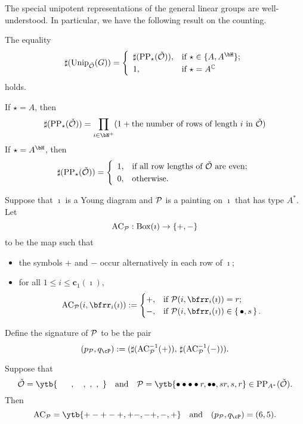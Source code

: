 \documentclass[counting_main.tex]{subfiles}
\begin{document}
 The special unipotent representations of the general linear groups are well-understood. In particular, we have the following result on the counting.
\begin{thm}
The equality
\[
\sharp(\Unip_{\check \CO}(G))= \left\{
     \begin{array}{ll}
        \sharp(\mathrm{PP}_\star(\check \CO)), &\hbox{if $\star\in\{A, A^\bH\}$}; \smallskip\\
           1, &\hbox{if $\star=A^\C$}  \end{array}
   \right.
\]
holds.

\end{thm}
\begin{remark}
If $\star=A$, then
\[
\sharp(\mathrm{PP}_\star(\check \CO))=\prod_{i\in \bN^+} (1+\textrm{the number of rows of length $i$ in $\check \CO$})
\]
If
 $\star=A^\bH$, then
\[
\sharp(\mathrm{PP}_\star(\check \CO))= \left\{
     \begin{array}{ll}
        1, &\hbox{if all row lengths of $\check \CO$ are even}; \smallskip\\
           0, &\hbox{otherwise}.  \end{array}
   \right.
\]

\end{remark}

Suppose that $\imath$ is a Young diagram and $\mathcal{P}$ is a painting on  $\imath$ that has type $A^*$. Let $$\mathrm{AC}_{\mathcal{P}}: \mathrm{Box}(\imath)\rightarrow \{+, -\}$$ to be the map such that
  \begin{itemize}
    \item the symbols $+$ and $-$ occur alternatively in each row of $\imath$;
    \item for all $1\leq i\leq \mathbf c_1(\imath) $,
    \[
       \mathrm{AC}_\CP (i,\bfrr_i(\imath)) := \begin{cases}
    +,  & \text{if  }\CP(i,\bfrr_i(\imath))=r;\\
    -,  & \text{if } \CP(i,\bfrr_i(\imath))\in \set{\bullet,s}.
  \end{cases}
    \]
  \end{itemize}
Define the signature of $\mathcal{P}$ to be the pair
\[
  (p_\CP, q_\cP):=(\sharp( \mathrm{AC}_\CP^{-1}(+)),\, \sharp( \mathrm{AC}_\CP^{-1}(-))).
\]

\begin{eg}
 Suppose that \[
\check \CO=\ytb{\ \ \ \ \ , \ \ \ , \ , \ , \   }\quad \textrm{and}\quad  \CP=\ytb{\bullet\bullet\bullet\bullet r,\bullet\bullet , sr,s,r}\in \mathrm{PP}_{A^*}(\check \CO) .
 \]
 Then
 \[
  \mathrm{AC}_\CP=
 \ytb{+-+-+,+-, -+,-,+}\quad \textrm{and}  \quad  (p_\CP, q_\cP)=(6,5).
  \]
\end{eg}
\end{document}
